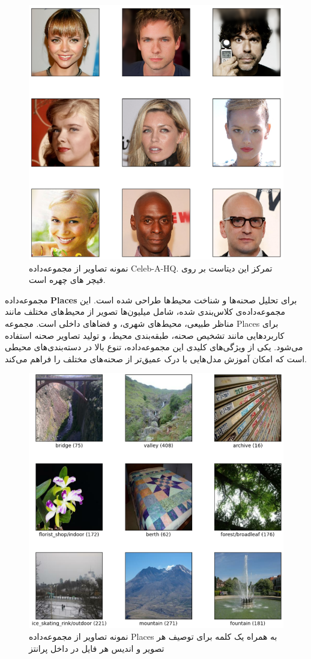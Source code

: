 \begin{figure}
	\centering
	\includegraphics[width=0.7\linewidth]{celebahq1}
	\caption{نمونه تصاویر از مجموعه‌داده Celeb-A-HQ. تمرکز این دیتاست بر روی فیچر های چهره است.}
	\label{fig:celebahq1}
\end{figure}

مجموعه‌داده \textbf{Places} برای تحلیل صحنه‌ها و شناخت محیط‌ها طراحی شده است. این مجموعه‌داده‌ی کلاس‌بندی شده، شامل میلیون‌ها تصویر از محیط‌های مختلف مانند مناظر طبیعی، محیط‌های شهری، و فضاهای داخلی است. مجموعه Places برای کاربردهایی مانند تشخیص صحنه، طبقه‌بندی محیط، و تولید تصاویر صحنه استفاده می‌شود. یکی از ویژگی‌های کلیدی این مجموعه‌داده، تنوع بالا در دسته‌بندی‌های محیطی است که امکان آموزش مدل‌هایی با درک عمیق‌تر از صحنه‌های مختلف را فراهم می‌کند.

\begin{figure}
	\centering
	\includegraphics[width=0.7\linewidth]{places1}
	\caption{نمونه تصاویر از مجموعه‌داده Places به همراه یک کلمه برای توصیف هر تصویر و اندیس هر فایل در داخل پرانتز}
	\label{fig:places1}
\end{figure}



